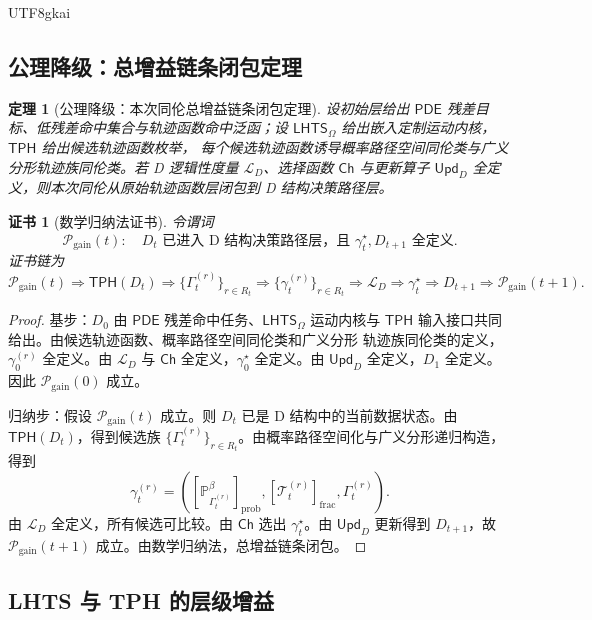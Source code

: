 \documentclass[12pt]{article}
\newtheorem{theorem}{定理}[section]
\newtheorem{Certificate}{证书}[section]
\newcommand{\LHTS}{\ensuremath{\mathsf{LHTS}}}
\newcommand{\TPH}{\ensuremath{\mathsf{TPH}}}
\newcommand{\PDE}{\ensuremath{\mathsf{PDE}}}
\begin{document}
\begin{CJK*}{UTF8}{gkai}
\subsection{公理降级：总增益链条闭包定理}
\label{subsec:total-gain-axiom-downgrade}

\begin{theorem}[公理降级：本次同伦总增益链条闭包定理]
设初始层给出 \(\PDE\) 残差目标、低残差命中集合与轨迹函数命中泛函；设
\(\LHTS_\Omega\) 给出嵌入定制运动内核，\(\TPH\) 给出候选轨迹函数枚举，
每个候选轨迹函数诱导概率路径空间同伦类与广义分形轨迹族同伦类。若
D 逻辑性度量 \(\mathcal L_D\)、选择函数 \(\mathsf{Ch}\) 与更新算子
\(\mathsf{Upd}_D\) 全定义，则本次同伦从原始轨迹函数层闭包到 D 结构决策路径层。
\end{theorem}

\begin{Certificate}[数学归纳法证书]
令谓词
\[
\mathcal P_{\mathrm{gain}}(t):
\quad
D_t\text{ 已进入 D 结构决策路径层，且 }
\gamma_t^\star,D_{t+1}\text{ 全定义}.
\]
证书链为
\[
\boxed{
\mathcal P_{\mathrm{gain}}(t)
\Rightarrow
\TPH(D_t)
\Rightarrow
\{\Gamma_t^{(r)}\}_{r\in R_t}
\Rightarrow
\{\gamma_t^{(r)}\}_{r\in R_t}
\Rightarrow
\mathcal L_D
\Rightarrow
\gamma_t^\star
\Rightarrow
D_{t+1}
\Rightarrow
\mathcal P_{\mathrm{gain}}(t+1).
}
\]
\end{Certificate}

\begin{proof}
基步：\(D_0\) 由 \(\PDE\) 残差命中任务、\(\LHTS_\Omega\) 运动内核与
\(\TPH\) 输入接口共同给出。由候选轨迹函数、概率路径空间同伦类和广义分形
轨迹族同伦类的定义，\(\gamma_0^{(r)}\) 全定义。由 \(\mathcal L_D\) 与
\(\mathsf{Ch}\) 全定义，\(\gamma_0^\star\) 全定义。由 \(\mathsf{Upd}_D\)
全定义，\(D_1\) 全定义。因此 \(\mathcal P_{\mathrm{gain}}(0)\) 成立。

归纳步：假设 \(\mathcal P_{\mathrm{gain}}(t)\) 成立。则 \(D_t\) 已是
D 结构中的当前数据状态。由 \(\TPH(D_t)\)，得到候选族
\(\{\Gamma_t^{(r)}\}_{r\in R_t}\)。由概率路径空间化与广义分形递归构造，
得到
\[
\gamma_t^{(r)}
=
\left(
[\mathbb P_{\Gamma_t^{(r)}}^\beta]_{\mathrm{prob}},
[\mathcal T_t^{(r)}]_{\mathrm{frac}},
\Gamma_t^{(r)}
\right).
\]
由 \(\mathcal L_D\) 全定义，所有候选可比较。由 \(\mathsf{Ch}\) 选出
\(\gamma_t^\star\)。由 \(\mathsf{Upd}_D\) 更新得到 \(D_{t+1}\)，故
\(\mathcal P_{\mathrm{gain}}(t+1)\) 成立。由数学归纳法，总增益链条闭包。
\end{proof}

\subsection{LHTS 与 TPH 的层级增益}
\label{subsec:lhts-tph-layer-gain}


\end{CJK*}
\end{document}
